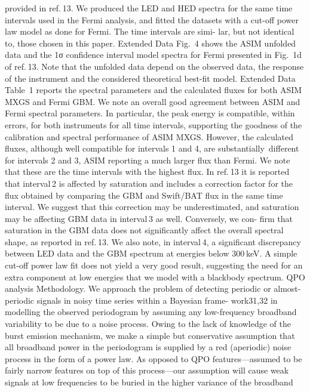 provided in ref. 13. We produced the LED and HED spectra for the same
time intervals used in the Fermi analysis, and fitted the datasets with a
cut-off power law model as done for Fermi. The time intervals are simi-
lar, but not identical to, those chosen in this paper. Extended Data Fig. 4
shows the ASIM unfolded data and the 1σ confidence interval model
spectra for Fermi presented in Fig. 1d of ref. 13. Note that the unfolded
data depend on the observed data, the response of the instrument and
the considered theoretical best-fit model. Extended Data Table 1 reports
the spectral parameters and the calculated fluxes for both ASIM MXGS
and Fermi GBM. We note an overall good agreement between ASIM and
Fermi spectral parameters. In particular, the peak energy is compatible,
within errors, for both instruments for all time intervals, supporting the
goodness of the calibration and spectral performance of ASIM MXGS.
However, the calculated fluxes, although well compatible for intervals
1 and 4, are substantially different for intervals 2 and 3, ASIM reporting
a much larger flux than Fermi. We note that these are the time intervals
with the highest flux. In ref. 13 it is reported that interval 2 is affected by
saturation and includes a correction factor for the flux obtained by
comparing the GBM and Swift/BAT flux in the same time interval. We
suggest that this correction may be underestimated, and saturation
may be affecting GBM data in interval 3 as well. Conversely, we con-
firm that saturation in the GBM data does not significantly affect the
overall spectral shape, as reported in ref. 13. We also note, in interval 4,
a significant discrepancy between LED data and the GBM spectrum at
energies below 300 keV. A simple cut-off power law fit does not yield
a very good result, suggesting the need for an extra component at low
energies that we model with a blackbody spectrum.
QPO analysis
Methodology. We approach the problem of detecting periodic or
almost-periodic signals in noisy time series within a Bayesian frame-
work31,32 in modelling the observed periodogram by assuming any
low-frequency broadband variability to be due to a noise process.
Owing to the lack of knowledge of the burst emission mechanism, we
make a simple but conservative assumption that all broadband power in
the periodogram is supplied by a red (aperiodic) noise process in the form
of a power law. As opposed to QPO features—assumed to be fairly narrow
features on top of this process—our assumption will cause weak signals
at low frequencies to be buried in the higher variance of the broadband
